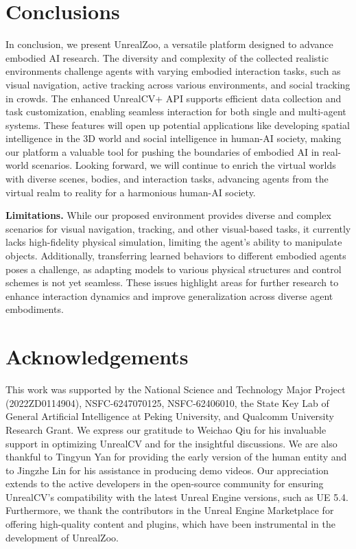 \documentclass{article}
\begin{document}
\section{Conclusions}
\vspace{-0.3cm}
In conclusion, we present UnrealZoo, a versatile platform designed to advance embodied AI research.
The diversity and complexity of the collected realistic environments challenge agents with varying embodied interaction tasks, such as visual navigation, active tracking across various environments, and social tracking in crowds. The enhanced UnrealCV+ API supports efficient data collection and task customization, enabling seamless interaction for both single and multi-agent systems. These features will open up potential applications like developing spatial intelligence in the 3D world and social intelligence in human-AI society, making our platform a valuable tool for pushing the boundaries of embodied AI in real-world scenarios. Looking forward, we will continue to enrich the virtual worlds with diverse scenes, bodies, and interaction tasks, advancing agents from the virtual realm to reality for a harmonious human-AI society.


\textbf{Limitations.} While our proposed environment provides diverse and complex scenarios for visual navigation, tracking, and other visual-based tasks, it currently lacks high-fidelity physical simulation, limiting the agent's ability to manipulate objects. Additionally, transferring learned behaviors to different embodied agents poses a challenge, as adapting models to various physical structures and control schemes is not yet seamless. These issues highlight areas for further research to enhance interaction dynamics and improve generalization across diverse agent embodiments.

\section*{Acknowledgements}
This work was supported by the National Science and Technology Major Project (2022ZD0114904), NSFC-6247070125, NSFC-62406010, the State Key Lab of General Artificial Intelligence at Peking University, and Qualcomm University Research Grant. We express our gratitude to Weichao Qiu for his invaluable support in optimizing UnrealCV and for the insightful discussions. We are also thankful to Tingyun Yan for providing the early version of the human entity and to Jingzhe Lin for his assistance in producing demo videos. Our appreciation extends to the active developers in the open-source community for ensuring UnrealCV's compatibility with the latest Unreal Engine versions, such as UE 5.4. Furthermore, we thank the contributors in the Unreal Engine Marketplace for offering high-quality content and plugins, which have been instrumental in the development of UnrealZoo.


% 


\clearpage
\appendix

\end{document}
